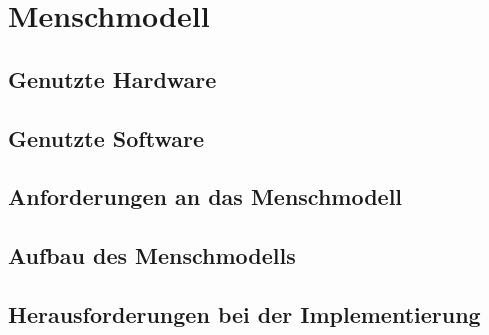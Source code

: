 \chapter{Menschmodell}\label{cha:Menschmodell}

\lipsum[3]

\section{Genutzte Hardware}\label{sec:Hardware}

\lipsum[3]

\section{Genutzte Software}\label{sec:Software}

\lipsum[3]

\section{Anforderungen an das Menschmodell}\label{sec:AnforderungenMenschmodell}

\lipsum[3]

\section{Aufbau des Menschmodells}\label{sec:AufbauMenschmodell}

\lipsum[3]

\section{Herausforderungen bei der Implementierung}\label{sec:HerausforderungenMenschmodell}

\lipsum[3]

